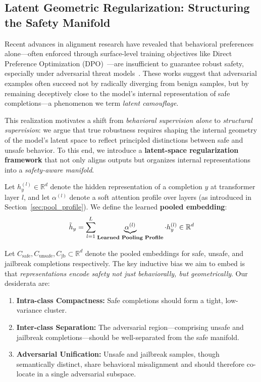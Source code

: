 \subsection{Latent Geometric Regularization: Structuring the Safety Manifold}

Recent advances in alignment research have revealed that behavioral preferences alone—often enforced through surface-level training objectives like Direct Preference Optimization (DPO)~\cite{rafailov2023direct}—are insufficient to guarantee robust safety, especially under adversarial threat models~\cite{turpin2023llms, zhu2024promptbench}. These works suggest that adversarial examples often succeed not by radically diverging from benign samples, but by remaining deceptively close to the model’s internal representation of safe completions—a phenomenon we term \textit{latent camouflage}.

This realization motivates a shift from \emph{behavioral supervision alone} to \emph{structural supervision}: we argue that true robustness requires shaping the internal geometry of the model’s latent space to reflect principled distinctions between safe and unsafe behavior. To this end, we introduce a \textbf{latent-space regularization framework} that not only aligns outputs but organizes internal representations into a \emph{safety-aware manifold}.

Let \( h^{(l)}_y \in \mathbb{R}^d \) denote the hidden representation of a completion \( y \) at transformer layer \( l \), and let \( \alpha^{(l)} \) denote a soft attention profile over layers (as introduced in Section~\ref{sec:pool_profile}). We define the learned \textbf{pooled embedding}:
\[
\tilde{h}_y = \sum_{l=1}^L \underbrace{\alpha^{(l)}}_{\text{\textbf{Learned Pooling Profile}}} \cdot h_y^{(l)} \in \mathbb{R}^d
\]

Let \( C_{\mathrm{safe}}, C_{\mathrm{unsafe}}, C_{\mathrm{jb}} \subset \mathbb{R}^d \) denote the pooled embeddings for safe, unsafe, and jailbreak completions respectively. The key inductive bias we aim to embed is that \emph{representations encode safety not just behaviorally, but geometrically}. Our desiderata are:

\begin{enumerate}[leftmargin=1.5em]
    \item \textbf{Intra-class Compactness:} Safe completions should form a tight, low-variance cluster.
    \item \textbf{Inter-class Separation:} The adversarial region—comprising unsafe and jailbreak completions—should be well-separated from the safe manifold.
    \item \textbf{Adversarial Unification:} Unsafe and jailbreak samples, though semantically distinct, share behavioral misalignment and should therefore co-locate in a single adversarial subspace.
\end{enumerate}

